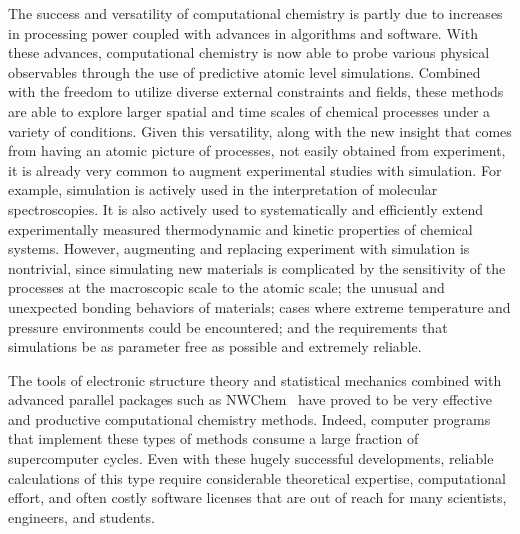 \documentclass[runningheads,a4paper]{llncs}
\begin{document}
The success and versatility of computational chemistry is partly due to increases in processing power coupled with advances in algorithms and software.  With these advances, computational chemistry is now able to probe various physical observables through the use of predictive atomic level simulations.  
Combined with the freedom to utilize diverse external constraints and fields, these methods are able to explore larger spatial and time scales of chemical processes under a variety of conditions. Given this versatility, along with the new insight
that comes from having an atomic picture of processes, not easily obtained from experiment, it is already very common to augment experimental studies with simulation.  For example, simulation is actively used in the interpretation of molecular spectroscopies.  It is also actively used to systematically and efficiently extend experimentally measured thermodynamic and kinetic properties of chemical systems.
However, augmenting and replacing experiment with simulation is nontrivial, since simulating new materials is complicated by the sensitivity of the processes at the macroscopic scale to the atomic scale; the unusual and unexpected bonding behaviors of materials; cases where extreme temperature and pressure environments could be encountered; and the requirements that simulations be as parameter free as possible and extremely reliable. 

The tools of electronic structure theory and statistical mechanics combined with advanced parallel packages such as NWChem~\cite{kendall2000high,valiev2010nwchem,apra2020nwchem,kowalski2021nwchem} have proved to be very effective and productive computational chemistry methods. Indeed, computer programs that implement these types of methods consume a large fraction of supercomputer cycles.  Even with these hugely successful developments, reliable calculations of this type require considerable theoretical expertise, computational effort, and often costly software licenses that are out of reach for many scientists, engineers, and students. 
\end{document}
